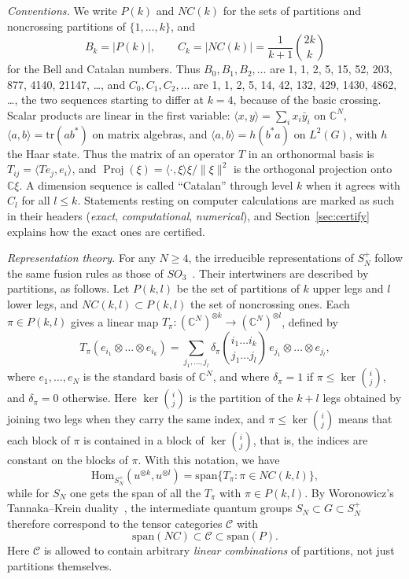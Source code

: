 \documentclass[11pt]{amsart}
\theoremstyle{definition}
\theoremstyle{remark}
\theoremstyle{plain}
\numberwithin{equation}{section}
\numberwithin{table}{section}
\newcommand{\C}{\mathbb C}
\DeclareMathOperator{\Proj}{Proj}
\begin{document}
\emph{Conventions.} We write $P(k)$ and $NC(k)$ for the sets of partitions and noncrossing partitions of $\{1,\dots,k\}$, and
\[
B_k=|P(k)|,\qquad C_k=|NC(k)|=\frac{1}{k+1}\binom{2k}{k}
\]
for the Bell and Catalan numbers. Thus $B_0,B_1,B_2,\dots$ are 1, 1, 2, 5, 15, 52, 203, 877, 4140, 21147, \dots, and $C_0,C_1,C_2,\dots$ are 1, 1, 2, 5, 14, 42, 132, 429, 1430, 4862, \dots, the two sequences starting to differ at $k=4$, because of the basic crossing. Scalar products are linear in the first variable: $\langle x,y\rangle=\sum_ix_i\bar y_i$ on $\C^N$, $\langle a,b\rangle=\mathrm{tr}(ab^*)$ on matrix algebras, and $\langle a,b\rangle=h(b^*a)$ on $L^2(G)$, with $h$ the Haar state. Thus the matrix of an operator $T$ in an orthonormal basis is $T_{ij}=\langle Te_j,e_i\rangle$, and $\Proj(\xi)=\langle\cdot,\xi\rangle\xi/\|\xi\|^2$ is the orthogonal projection onto $\C\xi$. A dimension sequence is called ``Catalan'' through level $k$ when it agrees with $C_l$ for all $l\le k$. Statements resting on computer calculations are marked as such in their headers (\emph{exact}, \emph{computational}, \emph{numerical}), and Section~\ref{sec:certify} explains how the exact ones are certified.

\medskip

\emph{Representation theory.} For any $N\ge4$, the irreducible representations of $S_N^+$ follow the same fusion rules as those of $SO_3$~\cite{ba}. Their intertwiners are described by partitions, as follows. Let $P(k,l)$ be the set of partitions of $k$ upper legs and $l$ lower legs, and $NC(k,l)\subset P(k,l)$ the set of noncrossing ones. Each $\pi\in P(k,l)$ gives a linear map $T_\pi:(\C^N)^{\otimes k}\to(\C^N)^{\otimes l}$, defined by
\[
T_\pi(e_{i_1}\otimes\dots\otimes e_{i_k})=\sum_{j_1,\dots,j_l}\delta_\pi\binom{i_1\dots i_k}{j_1\dots j_l}\,e_{j_1}\otimes\dots\otimes e_{j_l},
\]
where $e_1,\dots,e_N$ is the standard basis of $\C^N$, and where $\delta_\pi=1$ if $\pi\le\ker\binom{i}{j}$, and $\delta_\pi=0$ otherwise. Here $\ker\binom{i}{j}$ is the partition of the $k+l$ legs obtained by joining two legs when they carry the same index, and $\pi\le\ker\binom{i}{j}$ means that each block of $\pi$ is contained in a block of $\ker\binom{i}{j}$, that is, the indices are constant on the blocks of $\pi$. With this notation, we have
\[
\mathrm{Hom}_{S_N^+}(u^{\otimes k},u^{\otimes l})=\mathrm{span}\big\{T_\pi:\pi\in NC(k,l)\big\},
\]
while for $S_N$ one gets the span of all the $T_\pi$ with $\pi\in P(k,l)$. By Woronowicz's Tannaka--Krein duality~\cite{wo2}, the intermediate quantum groups $S_N\subset G\subset S_N^+$ therefore correspond to the tensor categories $\mathcal C$ with
\[
\mathrm{span}(NC)\subset\mathcal C\subset\mathrm{span}(P).
\]
Here $\mathcal C$ is allowed to contain arbitrary \emph{linear combinations} of partitions, not just partitions themselves.
\end{document}
